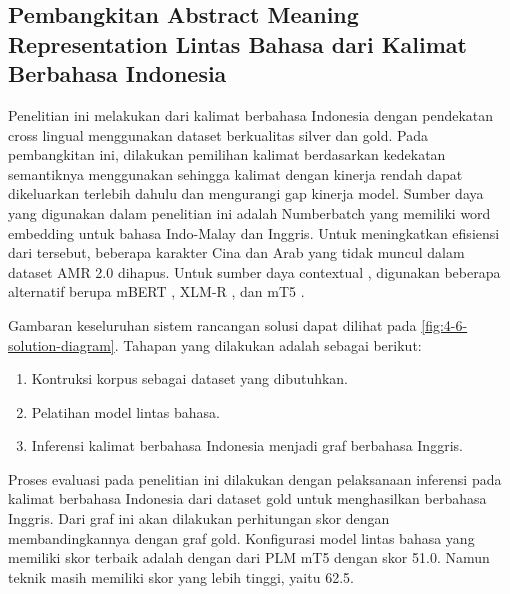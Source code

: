 \subsection{Pembangkitan Abstract Meaning Representation Lintas Bahasa dari Kalimat Berbahasa Indonesia }

Penelitian ini melakukan \amrparsing{} dari kalimat berbahasa Indonesia dengan pendekatan cross lingual menggunakan dataset berkualitas silver dan gold.
Pada pembangkitan ini, dilakukan pemilihan kalimat berdasarkan kedekatan semantiknya menggunakan \cossim{} sehingga kalimat dengan kinerja rendah dapat dikeluarkan terlebih dahulu dan mengurangi gap kinerja model.
Sumber daya yang digunakan dalam penelitian ini adalah \mwordem{} Numberbatch yang memiliki word embedding untuk bahasa Indo-Malay dan Inggris.
Untuk meningkatkan efisiensi dari \wordem{} tersebut, beberapa karakter Cina dan Arab yang tidak muncul dalam dataset AMR 2.0 dihapus.
Untuk sumber daya contextual \mwordem{}, digunakan beberapa alternatif berupa mBERT , XLM-R , dan mT5 .

Gambaran keseluruhan sistem rancangan solusi dapat dilihat pada \cref{fig:4-6-solution-diagram}.
Tahapan yang dilakukan adalah sebagai berikut:
\begin{enumerate}
  \item Kontruksi korpus sebagai dataset yang dibutuhkan.
  \item Pelatihan model \amrparsing{} lintas bahasa.
  \item Inferensi kalimat berbahasa Indonesia menjadi graf \AMR{} berbahasa Inggris.
\end{enumerate}


Proses evaluasi pada penelitian ini dilakukan dengan pelaksanaan inferensi pada kalimat berbahasa Indonesia dari dataset gold untuk menghasilkan \AMR{} berbahasa Inggris.
Dari graf \AMR{} ini akan dilakukan perhitungan skor \SMATCH{} dengan membandingkannya dengan graf \AMR{} gold.
Konfigurasi model \amrparsing{} lintas bahasa yang memiliki skor \SMATCH{} terbaik adalah dengan \mwordem{} dari \gls{PLM} mT5 dengan skor \SMATCH{} 51.0.
Namun teknik   masih memiliki skor \SMATCH{} yang lebih tinggi, yaitu 62.5.
